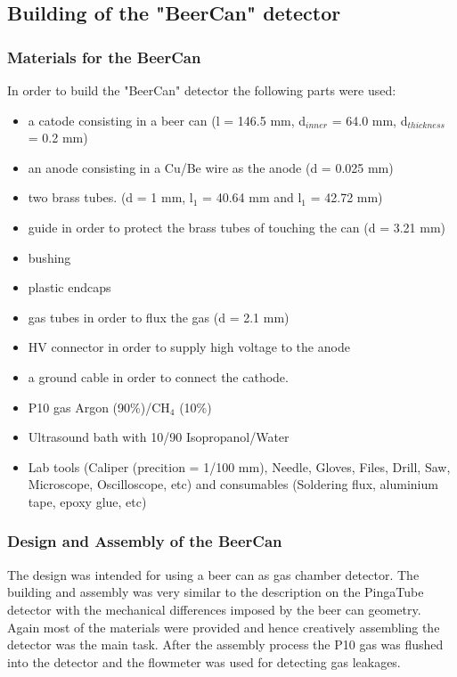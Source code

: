 \subsection{Building of the "BeerCan" detector}
\label{sec:building_beercan}

\subsubsection{Materials for the BeerCan}
\label{sec:materials_beercan}
In order to build the "BeerCan" detector the following parts were used:
\begin{itemize}
\item a catode consisting in a beer can (l = 146.5 mm, d$_{inner}$ = 64.0 mm,
  d$_{thickness}$ = 0.2 mm)
\item an anode consisting in a Cu/Be wire as the anode (d = 0.025 mm)
\item two brass tubes. (d = 1 mm, l$_{1}$ = 40.64 mm and l$_{1}$ = 42.72 mm)
\item guide in order to protect the brass tubes of touching the can (d = 3.21
  mm)
\item bushing
\item plastic endcaps
\item gas tubes in order to flux the gas (d = 2.1 mm)
\item HV connector in order to supply high voltage to the anode
\item a ground cable in order to connect the cathode.
\item P10 gas Argon (90\%)/CH$_{4}$ (10\%)
\item Ultrasound bath with 10/90 Isopropanol/Water
\item Lab tools (Caliper (precition = 1/100 mm), Needle, Gloves, Files, Drill,
  Saw, Microscope, Oscilloscope, etc) and consumables (Soldering flux, aluminium
  tape, epoxy glue, etc)
\end{itemize}

\subsubsection{Design and Assembly of the BeerCan}
\label{sec:design_and_assembly_beercan}
The design was intended for using a beer can as gas chamber detector. The
building and assembly was very similar to the description on the PingaTube
detector with the mechanical differences imposed by the beer can geometry.
Again most of the materials were provided and hence creatively assembling the
detector was the main task. After the assembly process the P10 gas was flushed
into the detector and the flowmeter was used for detecting gas leakages.

